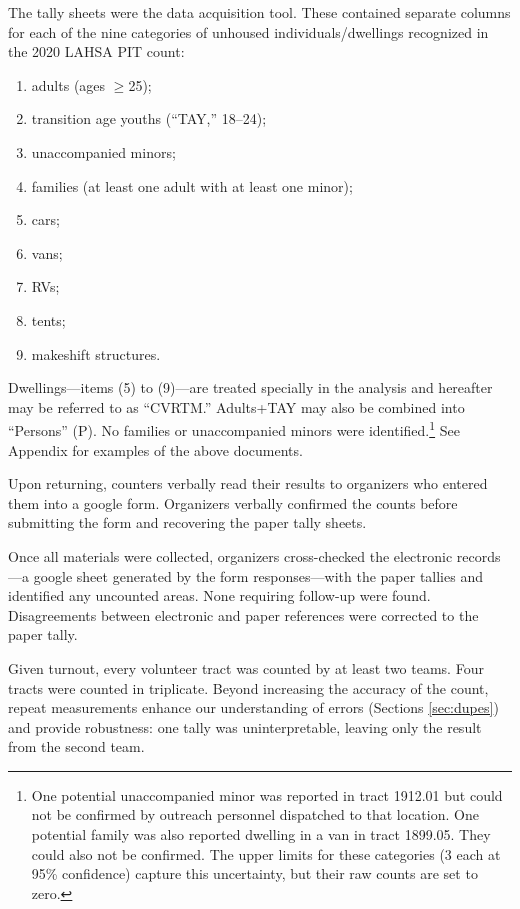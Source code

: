\documentclass[11pt,twocolumn]{article}
\def\bfr{\bf\color{red}}
\begin{document}
The tally sheets were the data acquisition tool. These contained separate columns for each of the 
nine categories of unhoused individuals/dwellings recognized in the 2020 LAHSA PIT count: 
\begin{enumerate}
	\item adults (ages $\geq$25);
	\item transition age youths (``TAY,'' 18--24);
	\item unaccompanied minors;
	\item families (at least one adult with at least one minor); 
	\item cars;
	\item vans;
	\item RVs;
	\item tents;
	\item makeshift structures.
\end{enumerate}
Dwellings---items (5) to (9)---are treated specially in the analysis and hereafter 
may be referred to as ``CVRTM.'' Adults+TAY may also be combined into 
``Persons'' (P). No families or unaccompanied minors were identified.\footnote{
One potential unaccompanied minor was reported in tract 1912.01 but could not be confirmed by outreach
personnel dispatched to that location. One potential family was also reported dwelling in a van in
tract 1899.05. They could also not be confirmed. The upper limits for these categories (3 each at 95\%
confidence) capture this uncertainty, but their raw counts are set to zero.} See Appendix for examples
of the above documents.

Upon returning, counters verbally read their results to organizers who entered them into a google 
form. Organizers verbally confirmed the counts before submitting the form and recovering the
paper tally sheets.

Once all materials were collected, organizers cross-checked the electronic records---a
google sheet generated by the form responses---with the paper tallies and identified any 
uncounted areas. None requiring follow-up were found. Disagreements between electronic 
and paper references were corrected to the paper tally. 

Given turnout, every volunteer tract was counted by at least two teams. Four tracts were counted
in triplicate. Beyond increasing the accuracy of the count, repeat measurements enhance our 
understanding of errors (Sections \ref{sec:dupes}) and provide robustness: one tally was 
uninterpretable, leaving only the result from the second team.
\end{document}
